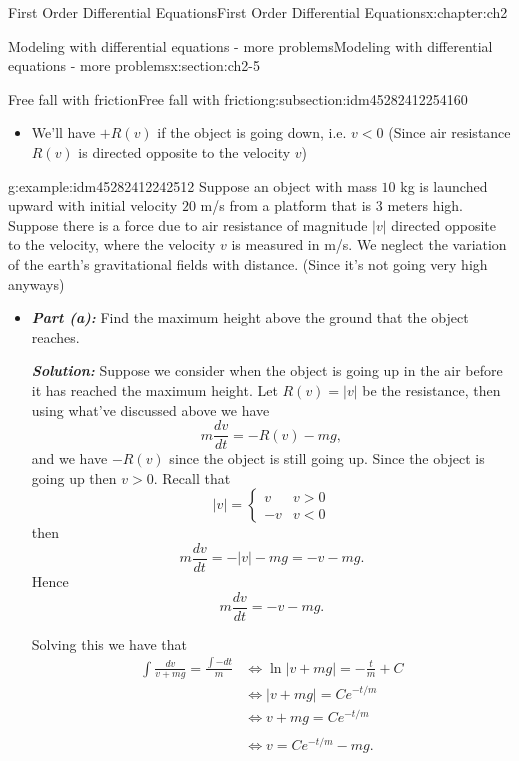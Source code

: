 \documentclass[oneside,10pt,]{book}
\newcommand{\alert}[1]{\textbf{\textit{#1}}}
\numberwithin{equation}{section}
\numberwithin{equation}{section}
\newcommand{\lt}{<}
\newcommand{\amp}{&}
\begin{document}
\begin{chapterptx}{First Order Differential Equations}{}{First Order Differential Equations}{}{}{x:chapter:ch2}
\begin{sectionptx}{Modeling with differential equations - more problems}{}{Modeling with differential equations - more problems}{}{}{x:section:ch2-5}
\begin{subsectionptx}{Free fall with friction}{}{Free fall with friction}{}{}{g:subsection:idm45282412254160}
\begin{itemize}[label=\textbullet]
\item{}We'll have \(+R(v)\) if the object is going down, i.e. \(v\lt0\) (Since air resistance \(R(v)\) is directed opposite to the velocity \(v\))%
\end{itemize}
\begin{example}{}{g:example:idm45282412242512}%
Suppose an object with mass \(10\) kg is launched upward with initial velocity \(20\) m\slash{}s from a platform that is \(3\) meters high. Suppose there is a force due to air resistance of magnitude \(\left|v\right|\) directed opposite to the velocity, where the velocity \(v\) is measured in m\slash{}s. We neglect the variation of the earth's gravitational fields with distance. (Since it's not going very high anyways)%
%
\begin{itemize}[label=\textbullet]
\item{}\alert{Part (a):} Find the maximum height above the ground that the object reaches.%
\par
\alert{Solution:} Suppose we consider when the object is going up in the air before it has reached the maximum height. Let \(R(v)=\left|v\right|\) be the resistance, then using what've discussed above we have%
\begin{equation*}
m\frac{dv}{dt}=-R(v)-mg,
\end{equation*}
and we have \(-R(v)\) since the object is still going up. Since the object is going up then \(v>0\). Recall that%
\begin{equation*}
\left|v\right|=\begin{cases}
v \amp v>0\\
-v \amp v\lt0
\end{cases}
\end{equation*}
then%
\begin{equation*}
m\frac{dv}{dt}=-\left|v\right|-mg=-v-mg.
\end{equation*}
Hence%
\begin{equation*}
m\frac{dv}{dt}=-v-mg.
\end{equation*}
%
\par
Solving this we have that%
\begin{align*}
\int\frac{dv}{v+mg}=\frac{\int-dt}{m} \amp \iff\ln\left|v+mg\right|=-\frac{t}{m}+C\\
\amp \iff\left|v+mg\right|=Ce^{-t/m}\\
\amp \iff v+mg=Ce^{-t/m}\\\\
\amp \iff v=Ce^{-t/m}-mg.
\end{align*}
%

\end{itemize}
\end{example}
\end{subsectionptx}
\end{sectionptx}
\end{chapterptx}
\end{document}

